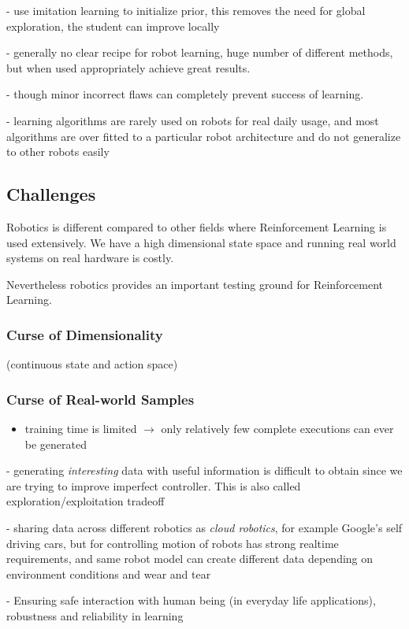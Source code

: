 - use imitation learning to initialize prior, this removes the need for global exploration,
  the student can improve locally

  - generally no clear recipe for robot learning, huge number of different methods,
  but when used appropriately achieve great results.

  - though minor incorrect flaws can completely prevent success of learning.

  - learning algorithms are rarely used on robots for real daily usage, and most
  algorithms are over fitted to a particular robot architecture and do not generalize
  to other robots easily
  
\subsection{Challenges}
Robotics is different compared to other fields where Reinforcement Learning
is used extensively. We have a high dimensional state space and running
real world systems on real hardware is costly.

Nevertheless robotics provides an important testing ground for Reinforcement Learning.

\subsubsection{Curse of Dimensionality}
(continuous state and action space)

\subsubsection{Curse of Real-world Samples}
\begin{itemize}
\item training time is limited $\rightarrow$ only relatively few complete executions can ever be generated
\end{itemize}

- generating \textit{interesting} data with useful information is difficult to
obtain since we are trying to improve imperfect controller. This is also
called exploration/exploitation tradeoff

- sharing data across different robotics as \textit{cloud robotics}, for example Google's self
driving cars, but for controlling motion of robots has strong realtime requirements, and
same robot model can create different data depending on environment conditions and
wear and tear

- Ensuring safe interaction with human being (in everyday life applications),
robustness and reliability in learning

